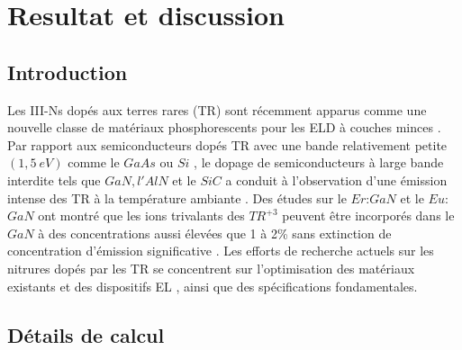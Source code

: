\chapter{Resultat et discussion } %
\label{Chapter3} %
\section{Introduction}
Les III-Ns dopés aux terres rares (TR) sont récemment apparus comme une nouvelle classe de matériaux phosphorescents pour les ELD à couches minces \cite{c1,c2}. Par rapport aux semiconducteurs dopés TR avec une bande relativement petite $ (1,5~eV) $ comme le $ GaAs $ ou $ Si $ \cite{c3,c4}, le dopage de semiconducteurs à large bande interdite tels que $ GaN, l'AlN $ et le $ SiC $ a conduit à l'observation d'une émission intense des TR à la température ambiante \cite{c5,c6}. Des études sur le $ Er $:$ GaN $ et le $ Eu $:$ GaN $ ont montré que les ions trivalants des $ TR^{+3} $ peuvent être incorporés dans le $ GaN $ à des concentrations aussi élevées que 1 à 2\% sans extinction de concentration d'émission significative \cite{c7,c8}. Les efforts de recherche actuels sur les nitrures dopés par les TR se concentrent sur l'optimisation des matériaux existants et des dispositifs EL \cite{c9,c5}, ainsi que des spécifications fondamentales.

\section{Détails de calcul}

